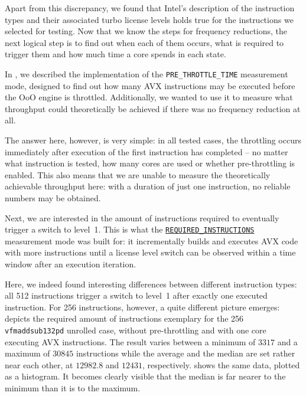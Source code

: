 Apart from this discrepancy, we found that Intel's description of the instruction types and their associated turbo license levels holds true for the instructions we selected for testing. Now that we know the steps for frequency reductions, the next logical step is to find out when each of them occurs, what is required to trigger them and how much time a core spends in each state.

In , we described the implementation of the \texttt{PRE\_THROTTLE\_TIME} measurement mode, designed to find out how many \gls{AVX} instructions may be executed before the \acrlong{OoO} engine is throttled. Additionally, we wanted to use it to measure what throughput could theoretically be achieved if there was no frequency reduction at all.

The answer here, however, is very simple: in all tested cases, the throttling occurs immediately after execution of the first instruction has completed -- no matter what instruction is tested, how many cores are used or whether pre-throttling is enabled. This also means that we are unable to measure the theoretically achievable throughput here: with a duration of just one instruction, no reliable numbers may be obtained.

Next, we are interested in the amount of instructions required to eventually trigger a switch to level~1. This is what the \hyperref[sec:analysis:design:measurementmodes:nonavxtime]{\texttt{REQUIRED\_INSTRUCTIONS}} measurement mode was built for: it incrementally builds and executes \gls{AVX} code with more instructions until a license level switch can be observed within a time window after an execution iteration.

Here, we indeed found interesting differences between different instruction types: all \SI[number-unit-product=-]{512}{\bit} instructions trigger a switch to level~1 after exactly one executed instruction. For \SI[number-unit-product=-]{256}{\bit} instructions, however, a quite different picture emerges:  depicts the required amount of instructions exemplary for the \SI[number-unit-product=-]{256}{\bit} \texttt{vfmaddsub132pd} unrolled case, without pre-throttling and with one core executing \gls{AVX} instructions. The result varies between a minimum of $3317$ and a maximum of $30845$ instructions while the average and the median are set rather near each other, at $12982.8$ and $12431$, respectively.  shows the same data, plotted as a histogram. It becomes clearly visible that the median is far nearer to the minimum than it is to the maximum.

